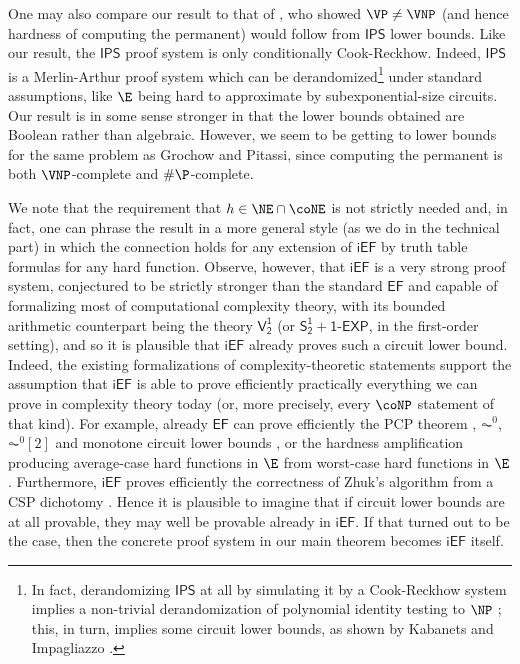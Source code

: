 \documentclass[11pt]{article}
\newcommand{\SOTEXP}{\mathsf{S^1_2} + \mathsf{1\textsf{-}EXP}}
\newcommand{\EF}{\mathsf{EF}}
\newcommand{\IPS}{\mathsf{IPS}}
\newcommand{\iEF}{\mathsf{iEF}}
\theoremstyle{definition}
\theoremstyle{plain}
\theoremstyle{remark}
\begin{document}
One may also compare our result to that of \citeauthor{GP18} \cite{GP18}, who showed $\VP \neq \VNP$ (and hence hardness of computing the permanent) would follow from $\IPS$ lower bounds. Like our result, the $\IPS$ proof system is only conditionally Cook-Reckhow. Indeed, $\IPS$ is a Merlin-Arthur proof system which can be derandomized\footnote{In fact, derandomizing $\IPS$ at all by simulating it by a Cook-Reckhow system implies a non-trivial derandomization of polynomial identity testing to $\NP$ \cite{grochow2023polynomial}; this, in turn, implies some circuit lower bounds, as shown by Kabanets and Impagliazzo \cite{kabanets2004derandomizing}.} under standard assumptions, like $\E$ being hard to approximate by subexponential-size circuits. 
Our result is in some sense stronger in that the lower bounds obtained are Boolean rather than algebraic. However, we seem to be getting to lower bounds for the same problem as Grochow and Pitassi, since computing the permanent is both $\VNP$-complete and $\#\P$-complete.

We note that the requirement that $h\in\NE\cap\coNE$ is not strictly needed and, in fact, one can phrase the result in a more general style (as we do in the technical part) in which the connection holds for any extension of $\iEF$ by truth table formulas for any hard function. Observe, however, that $\iEF$ is a very strong proof system, conjectured to be strictly stronger than the standard $\EF$ and capable of formalizing most of computational complexity theory, with its bounded arithmetic counterpart being the theory $\mathsf{V^1_2}$ (or $\SOTEXP$, in the first-order setting), and so it is plausible that $\iEF$ already proves such a circuit lower bound. Indeed, the existing formalizations of complexity-theoretic statements support the assumption that $\iEF$ is able to prove efficiently practically everything we can prove in complexity theory today (or, more precisely, every $\coNP$ statement of that kind). For example, already $\EF$ can prove efficiently the PCP theorem \cite{pich2015logical}, $\AC^0$, $\AC^0[2]$ and monotone circuit lower bounds \cite{razborov1995bounded, muller2020feasibly}, or the hardness amplification producing average-case hard functions in $\E$ from worst-case hard functions in $\E$ \cite{Jer05-PhD}. Furthermore, $\iEF$ proves efficiently the correctness of Zhuk's algorithm from a CSP dichotomy \cite{Gcsp1,Gcsp2}. Hence it is plausible to imagine that if circuit lower bounds are at all provable, they may well be provable already in $\iEF$. If that turned out to be the case, then the concrete proof system in our main theorem becomes $\iEF$ itself.
\end{document}
